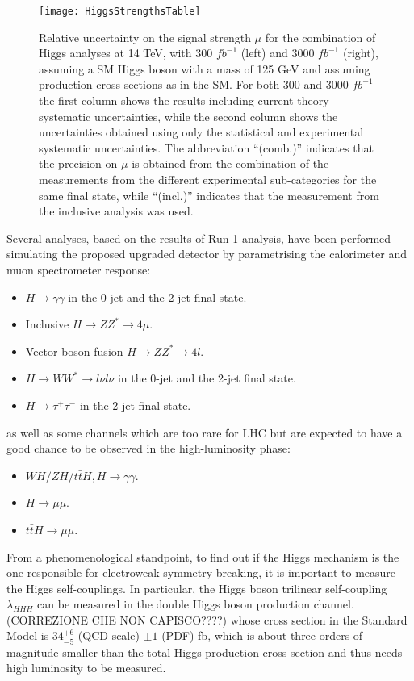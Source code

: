 \documentclass[a4paper,twoside,12pt]{article}
\begin{document}
\begin{figure} [h]
	\centering
	\texttt{[image: HiggsStrengthsTable]}
	\caption{Relative uncertainty on the signal strength $\mu$ for the combination of Higgs analyses at 14 TeV,
with 300 $fb^{-1}$ (left) and 3000 $fb^{-1}$ (right), assuming a SM Higgs boson with a mass of 125 GeV and
assuming production cross sections as in the SM. For both 300 and 3000 $fb^{-1}$ the first column shows
the results including current theory systematic uncertainties, while the second column shows the uncertainties obtained using only the statistical and experimental systematic uncertainties. The abbreviation
“(comb.)” indicates that the precision on $\mu$ is obtained from the combination of the measurements from
the different experimental sub-categories for the same final state, while “(incl.)” indicates that the measurement from the inclusive analysis was used\cite{higgsCouplings}.}
	\label{fig:HiggsTable}
\end{figure}


Several analyses, based on the results of Run-1 analysis, have been performed simulating the proposed upgraded
detector by parametrising the calorimeter and muon spectrometer response\cite{loi}\cite{scoping}:

\begin{itemize}
\item $H \rightarrow \gamma\gamma$ in the 0-jet and the 2-jet final state.
\item Inclusive $H \rightarrow ZZ^{*} \rightarrow 4\mu$.
\item Vector boson fusion $H \rightarrow ZZ^{*} \rightarrow 4l$.
\item $H \rightarrow WW^* \rightarrow l\nu l\nu$ in the 0-jet and the 2-jet final state.
\item $H \rightarrow \tau^+\tau^-$ in the 2-jet final state.
\end{itemize}

as well as some channels which are too rare for LHC but are expected to have a good chance
to be observed in the high-luminosity phase:
\begin{itemize}
\item $WH/ZH/t\bar{t}H, H \rightarrow \gamma\gamma$.
\item $H \rightarrow \mu\mu$.
\item $t\bar{t}H \rightarrow \mu\mu$.
\end{itemize}


\bigskip
\bigskip
\bigskip


From a phenomenological standpoint, to find out if the Higgs mechanism is the one responsible
for electroweak symmetry breaking, it is important to measure the Higgs self-couplings.
In particular, the Higgs boson trilinear self-coupling $\lambda_{HHH}$ can be measured
in the double Higgs boson production channel. (CORREZIONE CHE NON CAPISCO????) whose cross section in the Standard Model is
$34^{+6}_{-5}$ (QCD scale) $\pm 1$ (PDF) fb, which is about three orders of magnitude
smaller than the total Higgs production cross section and thus needs high
luminosity to be measured. \\
\end{document}
